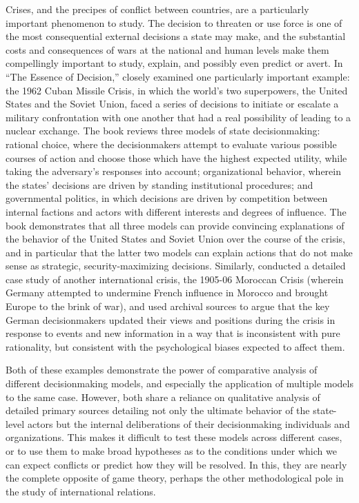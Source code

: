 Crises, and the precipes of conflict between countries, are a particularly important phenomenon to study. The decision to threaten or use force is one of the most consequential external decisions a state may make, and the substantial costs and consequences of wars at the national and human levels make them compellingly important to study, explain, and possibly even predict or avert. In ``The Essence of Decision,'' \citet{allison_1999} closely examined one particularly important example: the 1962 Cuban Missile Crisis, in which the world's two superpowers, the United States and the Soviet Union, faced a series of decisions to initiate or escalate a military confrontation with one another that had a real possibility of leading to a nuclear exchange. The book reviews three models of state decisionmaking: rational choice, where the decisionmakers attempt to evaluate various possible courses of action and choose those which have the highest expected utility, while taking the adversary's responses into account; organizational behavior, wherein the states' decisions are driven by standing institutional procedures; and governmental politics, in which decisions are driven by competition between internal factions and actors with different interests and degrees of influence. The book demonstrates that all three models can provide convincing explanations of the behavior of the United States and Soviet Union over the course of the crisis, and in particular that the latter two models can explain actions that do not make sense as strategic, security-maximizing decisions. Similarly, \citet{kaufmann_1994} conducted a detailed case study of another international crisis, the 1905-06 Moroccan Crisis (wherein Germany attempted to undermine French influence in Morocco and brought Europe to the brink of war), and used archival sources to argue that the key German decisionmakers updated their views and positions during the crisis in response to events and new information in a way that is inconsistent with pure rationality, but consistent with the psychological biases expected to affect them.

Both of these examples demonstrate the power of comparative analysis of different decisionmaking models, and especially the application of multiple models to the same case. However, both share a reliance on qualitative analysis of detailed primary sources detailing not only the ultimate behavior of the state-level actors but the internal deliberations of their decisionmaking individuals and organizations. This makes it difficult to test these models across different cases, or to use them to make broad hypotheses as to the conditions under which we can expect conflicts or predict how they will be resolved. In this, they are nearly the complete opposite of game theory, perhaps the other methodological pole in the study of international relations. 


